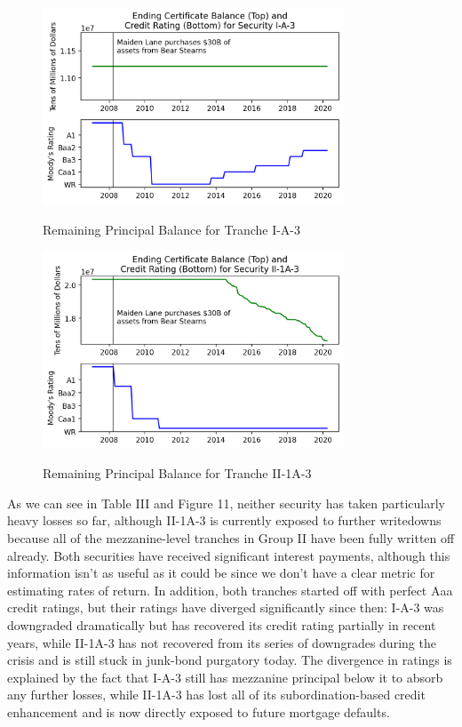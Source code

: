 \documentclass[12pt]{article}
\begin{document}
\begin{figure}[h]
	\centering
	\caption{Remaining Principal Balance for Tranche I-A-3}
	\includegraphics[width=0.8\textwidth]{../figures/timeseries_maiden_lane_ia3}
	\label{fig:timeseries_maiden_lane_ia3}
\end{figure}

\begin{figure}[h]
	\centering
	\caption{Remaining Principal Balance for Tranche II-1A-3}
	\includegraphics[width=0.8\textwidth]{../figures/timeseries_maiden_lane_ii1a3}
	\label{fig:timeseries_maiden_lane_ii1a3}
\end{figure}

As we can see in Table III and Figure 11, neither security has taken particularly heavy losses so far, although II-1A-3 is currently exposed to further writedowns because all of the mezzanine-level tranches in Group II have been fully written off already. Both securities have received significant interest payments, although this information isn’t as useful as it could be since we don’t have a clear metric for estimating rates of return. In addition, both tranches started off with perfect Aaa credit ratings, but their ratings have diverged significantly since then: I-A-3 was downgraded dramatically but has recovered its credit rating partially in recent years, while II-1A-3 has not recovered from its series of downgrades during the crisis and is still stuck in junk-bond purgatory today. The divergence in ratings is explained by the fact that I-A-3 still has mezzanine principal below it to absorb any further losses, while II-1A-3 has lost all of its subordination-based credit enhancement and is now directly exposed to future mortgage defaults.
\end{document}
